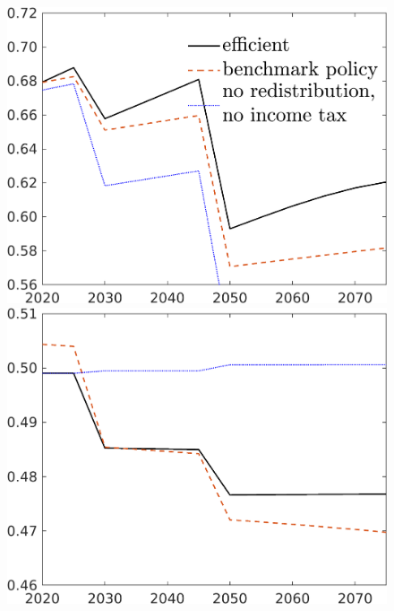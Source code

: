 \begin{figure}[h!!]
	\begin{minipage}[]{0.32\textwidth}
		\includegraphics[width=1\textwidth]{../../codding_model/own_basedOnFried/optimalPol_190722_tidiedUp/figures/all_July22/C_CompEffOPT_T_NoTaus_pol2_spillover0_noskill0_sep1_xgrowth0_etaa0.79_lgd1_lff0.png}
	\end{minipage}
	\begin{minipage}[]{0.32\textwidth}
		\includegraphics[width=1\textwidth]{../../codding_model/own_basedOnFried/optimalPol_190722_tidiedUp/figures/all_July22/hh_CompEffOPT_T_NoTaus_pol2_spillover0_noskill0_sep1_xgrowth0_etaa0.79_lgd0_lff0.png}

\end{minipage}
\end{figure}
